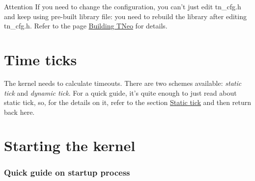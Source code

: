 \begin{DoxyAttention}{Attention}
If you need to change the configuration, you can't just edit {\ttfamily tn\+\_\+cfg.\+h} and keep using pre-\/built library file\+: you need to rebuild the library after editing {\ttfamily tn\+\_\+cfg.\+h}. Refer to the page \hyperlink{building}{Building T\+Neo} for details.
\end{DoxyAttention}
\hypertarget{quick_guide_quick_guide__time_ticks}{}\section{Time ticks}\label{quick_guide_quick_guide__time_ticks}
The kernel needs to calculate timeouts. There are two schemes available\+: {\itshape static tick} and {\itshape dynamic tick}. For a quick guide, it's quite enough to just read about static tick, so, for the details on it, refer to the section \hyperlink{time_ticks_time_ticks__static_tick}{Static tick} and then return back here.\hypertarget{quick_guide_starting_the_kernel}{}\section{Starting the kernel}\label{quick_guide_starting_the_kernel}
\subsubsection*{Quick guide on startup process}


